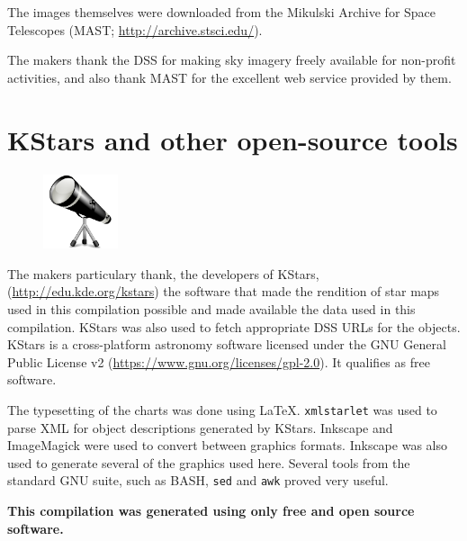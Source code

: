 The images themselves were downloaded from the Mikulski Archive for
Space Telescopes (MAST; \url{http://archive.stsci.edu/}).

The makers thank the DSS for making sky imagery freely available for
non-profit activities, and also thank MAST for the excellent web
service provided by them.

\section*{KStars and other open-source tools}
\begin{figure}
\centering
\includegraphics[width=0.195\textwidth]{kstars.pdf}
\end{figure}
The makers particulary thank, the developers of KStars,
(\url{http://edu.kde.org/kstars}) the software that made the rendition
of star maps used in this compilation possible and made available the
data used in this compilation. KStars was also used to fetch
appropriate DSS URLs for the objects. KStars is a cross-platform
astronomy software licensed under the GNU General Public License v2
(\url{https://www.gnu.org/licenses/gpl-2.0}). It qualifies as free
software.

The typesetting of the charts was done using
\LaTeX. \texttt{xmlstarlet} was used to parse XML for object
descriptions generated by KStars. Inkscape and ImageMagick were used
to convert between graphics formats. Inkscape was also used to
generate several of the graphics used here. Several tools from the
standard GNU suite, such as BASH, \texttt{sed} and \texttt{awk} proved
very useful.

\textbf{This compilation was generated using only free and open source
software.}

